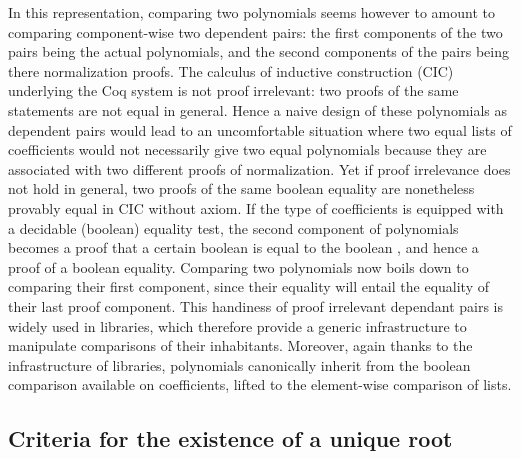 \documentclass{mscs}
\begin{document}
In this representation, comparing two polynomials seems however to
amount to comparing component-wise two dependent pairs: the first
components of
the two pairs being the actual polynomials, and the second components
of the pairs being there normalization proofs. The calculus of
inductive construction (CIC) underlying the Coq system is not proof
irrelevant: two proofs of the same statements are not equal in
general. Hence a naive design of these polynomials as dependent pairs
would lead to an uncomfortable situation where two equal lists of
coefficients would not necessarily give two equal polynomials because
they are associated with two different proofs of normalization. Yet if
proof irrelevance does not hold in general, two proofs of the same
boolean equality are nonetheless provably equal in CIC without axiom.
If the type  of coefficients is equipped with a decidable
(boolean) equality test, the second component of polynomials becomes a
proof that a certain boolean is equal to the boolean , and
hence a proof of a boolean equality. Comparing two polynomials now
boils down to comparing their first component, since their equality
will entail the equality of their last proof component. This
handiness of proof irrelevant dependant pairs is widely used in \ssr{}
libraries, which therefore provide a generic infrastructure to
manipulate comparisons of their inhabitants. Moreover, again thanks
to the infrastructure of \ssr{} libraries, polynomials
canonically inherit from the boolean comparison available on
coefficients, lifted to the element-wise comparison of lists.






\subsection{Criteria for the existence of a unique root}
\end{document}
